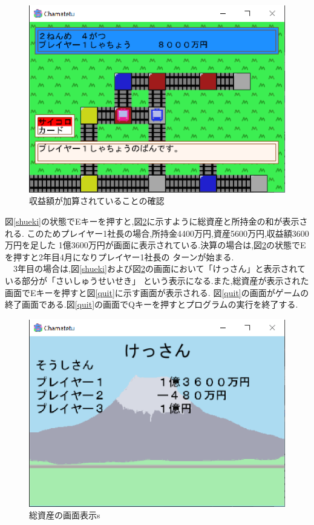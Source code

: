 \documentclass[a4j]{jarticle}
\begin{document}
    \begin{figure}[H]
        \centering
        \includegraphics[scale=1.3]{yorozu.eps}
        \caption{収益額が加算されていることの確認}
         \label{yorozu}
        \end{figure}

        図\ref{shueki}の状態でEキーを押すと,図\ref{sisan}に示すように総資産と所持金の和が表示される.
        このためプレイヤー1社長の場合,所持金4400万円,資産5600万円,収益額3600万円を足した
        1億3600万円が画面に表示されている.決算の場合は,図\ref{sisan}の状態でEを押すと2年目4月になりプレイヤー1社長の
        ターンが始まる.\\
        　3年目の場合は,図\ref{shueki}および図\ref{sisan}の画面において「けっさん」と表示されている部分が「さいしゅうせいせき」
        という表示になる.また,総資産が表示された画面でEキーを押すと図\ref{quit}に示す画面が表示される.
        図\ref{quit}の画面がゲームの終了画面である.図\ref{quit}の画面でQキーを押すとプログラムの実行を終了する.
        

    \begin{figure}[H]
        \centering
        \includegraphics[scale=1.3]{sisan.eps}
        \caption{総資産の画面表示s}
         \label{sisan}
        \end{figure}
\end{document}
